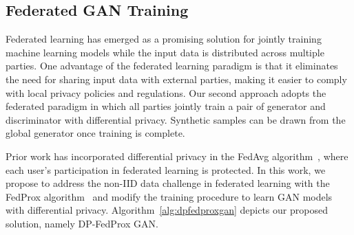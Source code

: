 \documentclass[conference]{IEEEtran}
\begin{document}












\subsection{Federated GAN Training}



Federated learning has emerged as a promising solution for jointly training machine learning models while the input data is distributed across multiple parties. One advantage of the federated learning paradigm is that it eliminates the need for sharing input data with external parties, making it easier to comply with local privacy policies and regulations. Our second approach adopts the federated paradigm in which all parties jointly train a pair of generator and discriminator with differential privacy. Synthetic samples can be drawn from the global generator once training is complete. 

Prior work has incorporated differential privacy in the FedAvg algorithm~\cite{DPFedAvg2018}, where each user's participation in federated learning is protected. In this work, we propose to address the non-IID data challenge in federated learning with the FedProx algorithm~\cite{Fedprox2018} and modify the training procedure to learn GAN models with differential privacy. Algorithm~\ref{alg:dpfedproxgan} depicts our proposed solution, namely DP-FedProx GAN.  
\end{document}
